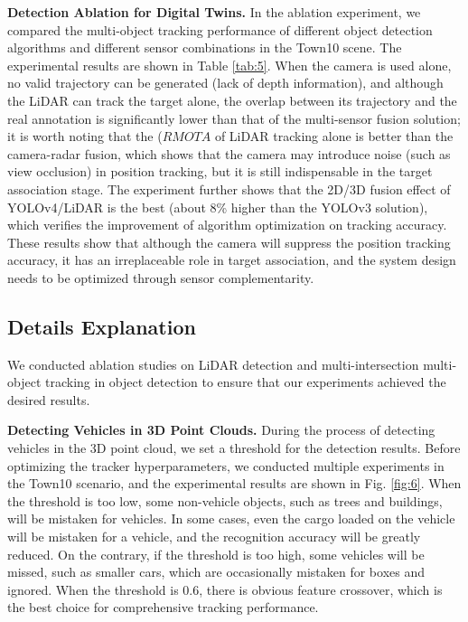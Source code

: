 \documentclass[journal,twoside,web]{ieeecolor}
\begin{document}
\textbf{Detection Ablation for Digital Twins.}
In the ablation experiment, we compared the multi-object tracking performance of different object detection algorithms and different sensor combinations in the Town10 scene.
The experimental results are shown in Table \ref{tab:5}.
When the camera is used alone, no valid trajectory can be generated (lack of depth information), and although the LiDAR can track the target alone, the overlap between its trajectory and the real annotation is significantly lower than that of the multi-sensor fusion solution; it is worth noting that the (\(RMOTA\) of LiDAR tracking alone is better than the camera-radar fusion, which shows that the camera may introduce noise (such as view occlusion) in position tracking, but it is still indispensable in the target association stage.
The experiment further shows that the 2D/3D fusion effect of YOLOv4/LiDAR is the best (about 8\% higher than the YOLOv3 solution), which verifies the improvement of algorithm optimization on tracking accuracy.
These results show that although the camera will suppress the position tracking accuracy, it has an irreplaceable role in target association, and the system design needs to be optimized through sensor complementarity.

\subsection{Details Explanation}

We conducted ablation studies on LiDAR detection and multi-intersection multi-object tracking in object detection to ensure that our experiments achieved the desired results.

\textbf{Detecting Vehicles in 3D Point Clouds.}
During the process of detecting vehicles in the 3D point cloud, we set a threshold for the detection results.
Before optimizing the tracker hyperparameters, we conducted multiple experiments in the Town10 scenario, and the experimental results are shown in Fig. \ref{fig:6}.
When the threshold is too low, some non-vehicle objects, such as trees and buildings, will be mistaken for vehicles. In some cases, even the cargo loaded on the vehicle will be mistaken for a vehicle, and the recognition accuracy will be greatly reduced.
On the contrary, if the threshold is too high, some vehicles will be missed, such as smaller cars, which are occasionally mistaken for boxes and ignored.
When the threshold is 0.6, there is obvious feature crossover, which is the best choice for comprehensive tracking performance.
\end{document}
